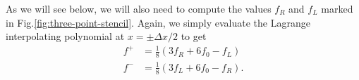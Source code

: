 \documentclass[12pt]{article}
\theoremstyle{definition}
\theoremstyle{definition}
\theoremstyle{definition}
\begin{document}
As we will see below, we will also need to compute the values $f_R$
and $f_L$ marked in
Fig.\thinspace\ref{fig:three-point-stencil}. Again, we simply
evaluate the Lagrange interpolating polynomial at $x = \pm \Delta x/2$
to get
\begin{subequations}
\begin{align}
  f^+ &= \frac{1}{8} ( 3 f_{R} + 6 f_0 - f_L ) \\
  f^- &= \frac{1}{8} ( 3 f_{L} + 6 f_0 - f_R ).
\end{align}
\end{subequations}
\end{document}
